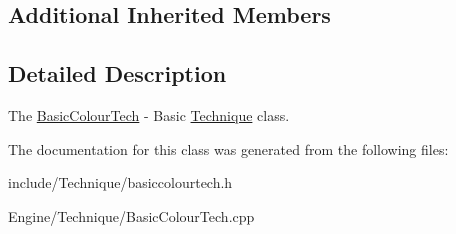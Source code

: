 \subsection*{Additional Inherited Members}


\subsection{Detailed Description}
The \hyperlink{classEngine_1_1BasicColourTech}{Basic\+Colour\+Tech} -\/ Basic \hyperlink{classEngine_1_1Technique}{Technique} class. 

The documentation for this class was generated from the following files\+:\begin{DoxyCompactItemize}
\item 
include/\+Technique/basiccolourtech.\+h\item 
Engine/\+Technique/Basic\+Colour\+Tech.\+cpp\end{DoxyCompactItemize}
